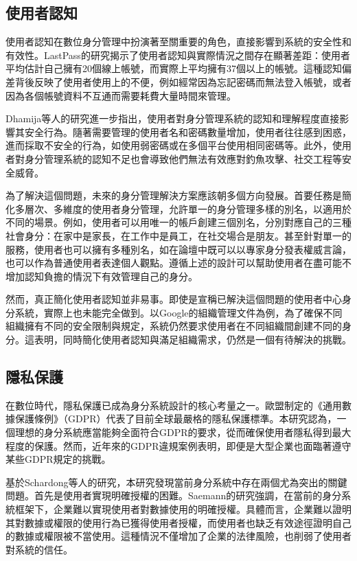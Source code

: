 \subsection{使用者認知}
使用者認知在數位身分管理中扮演著至關重要的角色，直接影響到系統的安全性和有效性。LastPass\cite{lastpass2020psychology}的研究揭示了使用者認知與實際情況之間存在顯著差距：使用者平均估計自己擁有20個線上帳號，而實際上平均擁有37個以上的帳號。這種認知偏差背後反映了使用者使用上的不便，例如經常因為忘記密碼而無法登入帳號，或者因為各個帳號資料不互通而需要耗費大量時間來管理。

Dhamija等人\cite{dhamija2008sevenflaws}的研究進一步指出，使用者對身分管理系統的認知和理解程度直接影響其安全行為。隨著需要管理的使用者名和密碼數量增加，使用者往往感到困惑，進而採取不安全的行為，如使用弱密碼或在多個平台使用相同密碼等。此外，使用者對身分管理系統的認知不足也會導致他們無法有效應對釣魚攻擊、社交工程等安全威脅。

為了解決這個問題，未來的身分管理解決方案應該朝多個方向發展。首要任務是簡化多層次、多維度的使用者身分管理，允許單一的身分管理多樣的別名，以適用於不同的場景。例如，使用者可以用唯一的帳戶創建三個別名，分別對應自己的三種社會身分：在家中是家長，在工作中是員工，在社交場合是朋友。甚至針對單一的服務，使用者也可以擁有多種別名，如在論壇中既可以以專家身分發表權威言論，也可以作為普通使用者表達個人觀點。遵循上述的設計可以幫助使用者在盡可能不增加認知負擔的情況下有效管理自己的身分。

然而，真正簡化使用者認知並非易事。即使是宣稱已解決這個問題的使用者中心身分系統，實際上也未能完全做到。以Google的組織管理文件\cite{gcp2024identity}為例，為了確保不同組織擁有不同的安全限制與規定，系統仍然要求使用者在不同組織間創建不同的身分。這表明，同時簡化使用者認知與滿足組織需求，仍然是一個有待解決的挑戰。
\subsection{隱私保護}
在數位時代，隱私保護已成為身分系統設計的核心考量之一。歐盟制定的《通用數據保護條例》（GDPR）\cite{GDPR2016}代表了目前全球最嚴格的隱私保護標準。本研究認為，一個理想的身分系統應當能夠全面符合GDPR的要求，從而確保使用者隱私得到最大程度的保護。然而，近年來的GDPR違規案例表明，即便是大型企業也面臨著遵守某些GDPR規定的挑戰。

基於Schardong等人的研究\cite{s22155641}，本研究發現當前身分系統中存在兩個尤為突出的關鍵問題。首先是使用者實現明確授權的困難。Saemann\cite{saemann2022investigating}的研究強調，在當前的身分系統框架下，企業難以實現使用者對數據使用的明確授權。具體而言，企業難以證明其對數據或權限的使用行為已獲得使用者授權，而使用者也缺乏有效途徑證明自己的數據或權限被不當使用。這種情況不僅增加了企業的法律風險，也削弱了使用者對系統的信任。

